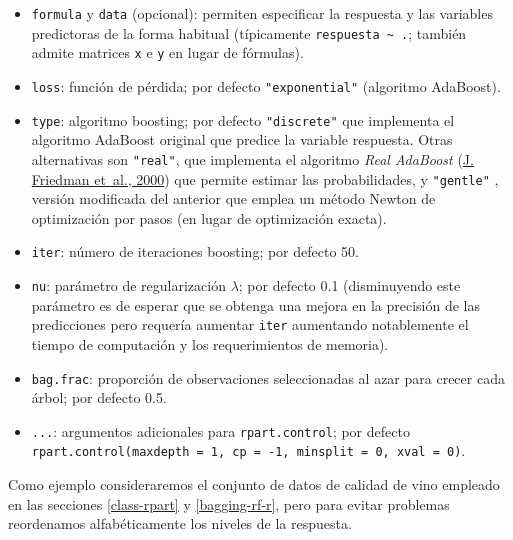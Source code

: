 \documentclass[
]{book}
\theoremstyle{break}
\theoremstyle{nonumberplain}
\begin{document}
\begin{itemize}
\item
  \texttt{formula} y \texttt{data} (opcional): permiten especificar la respuesta y las variables predictoras de la forma habitual (típicamente \texttt{respuesta\ \textasciitilde{}\ .}; también admite matrices \texttt{x} e \texttt{y} en lugar de fórmulas).
\item
  \texttt{loss}: función de pérdida; por defecto \texttt{"exponential"} (algoritmo AdaBoost).
\item
  \texttt{type}: algoritmo boosting; por defecto \texttt{"discrete"} que implementa el algoritmo AdaBoost original que predice la variable respuesta. Otras alternativas son \texttt{"real"}, que implementa el algoritmo \emph{Real AdaBoost} (\protect\hyperlink{ref-friedman2000additive}{J. Friedman et~al., 2000}) que permite estimar las probabilidades, y \texttt{"gentle"} , versión modificada del anterior que emplea un método Newton de optimización por pasos (en lugar de optimización exacta).
\item
  \texttt{iter}: número de iteraciones boosting; por defecto 50.
\item
  \texttt{nu}: parámetro de regularización \(\lambda\); por defecto 0.1 (disminuyendo este parámetro es de esperar que se obtenga una mejora en la precisión de las predicciones pero requería aumentar \texttt{iter} aumentando notablemente el tiempo de computación y los requerimientos de memoria).
\item
  \texttt{bag.frac}: proporción de observaciones seleccionadas al azar para crecer cada árbol; por defecto 0.5.
\item
  \texttt{...}: argumentos adicionales para \texttt{rpart.control}; por defecto \texttt{rpart.control(maxdepth\ =\ 1,\ cp\ =\ -1,\ minsplit\ =\ 0,\ xval\ =\ 0)}.
\end{itemize}

Como ejemplo consideraremos el conjunto de datos de calidad de vino empleado en las secciones \ref{class-rpart} y \ref{bagging-rf-r}, pero para evitar problemas reordenamos alfabéticamente los niveles de la respuesta.
\end{document}
